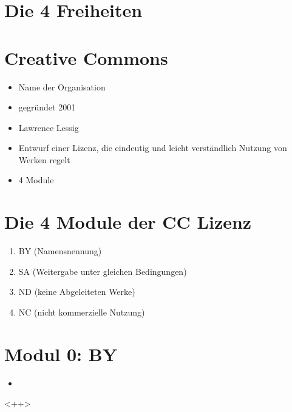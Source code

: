 \documentclass[14pt,handout]{beamer}
\begin{document}
\section{Die 4 Freiheiten}
\section{Creative Commons}
\begin{itemize}
    \item Name der Organisation
    \item gegründet 2001
    \item Lawrence Lessig
    \item Entwurf einer Lizenz, die eindeutig und leicht verständlich Nutzung von Werken regelt
    \item 4 Module
\end{itemize}
\section{Die 4 Module der CC Lizenz}
\begin{enumerate}
    \item BY (Namensnennung)
    \item SA (Weitergabe unter gleichen Bedingungen)
    \item ND (keine Abgeleiteten Werke)
    \item NC (nicht kommerzielle Nutzung)
\end{enumerate}
\section{Modul 0: BY}
\begin{itemize}
    \item 
\end{itemize}<++>
\end{document}
